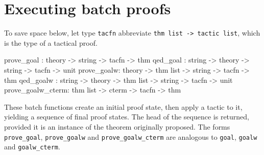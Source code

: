 \section{Executing batch proofs}
%
To save space below, let type \texttt{tacfn} abbreviate \texttt{thm list ->
  tactic list}, which is the type of a tactical proof.
\begin{ttbox}
prove_goal :           theory ->             string -> tacfn -> thm
qed_goal   : string -> theory ->             string -> tacfn -> unit
prove_goalw:           theory -> thm list -> string -> tacfn -> thm
qed_goalw  : string -> theory -> thm list -> string -> tacfn -> unit
prove_goalw_cterm:               thm list -> cterm  -> tacfn -> thm
\end{ttbox}
These batch functions create an initial proof state, then apply a tactic to
it, yielding a sequence of final proof states.  The head of the sequence is
returned, provided it is an instance of the theorem originally proposed.
The forms \texttt{prove_goal}, \texttt{prove_goalw} and \texttt{prove_goalw_cterm}
are analogous to \texttt{goal}, \texttt{goalw} and \texttt{goalw_cterm}.

